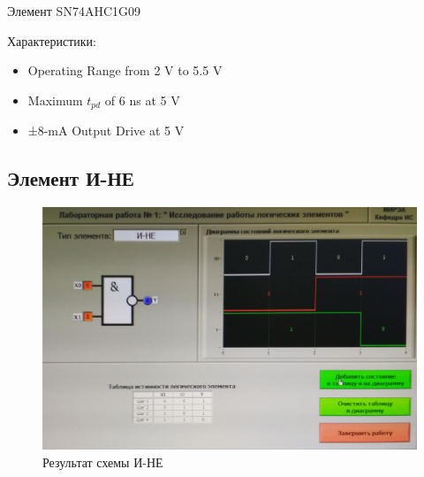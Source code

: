 Элемент SN74AHC1G09
 
Характеристики:
\begin{itemize}
	\item Operating Range from 2 V to 5.5 V
	\item Maximum $t_{pd}$ of 6 ns at 5 V
	\item ±8-mA Output Drive at 5 V
\end{itemize}

\subsection{Элемент И-НЕ}

\begin{figure}[H]
	\centering
	\includegraphics[width=0.85\linewidth]{imgs/1/and-not}
	\caption{Результат схемы И-НЕ}
	\label{fig:1_and-not}
\end{figure}


